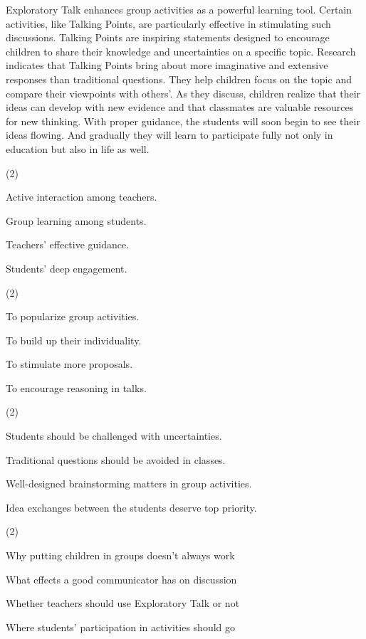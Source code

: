 \documentclass{英语试卷}
\begin{document}
\par Exploratory Talk enhances group activities as a powerful learning tool. Certain activities, like Talking Points, are particularly effective in stimulating such discussions. Talking Points are inspiring statements designed to encourage children to share their knowledge and uncertainties on a specific topic. Research indicates that Talking Points bring about more imaginative and extensive responses than traditional questions. They help children focus on the topic and compare their viewpoints with others'. As they discuss, children realize that their ideas can develop with new evidence and that classmates are valuable resources for new thinking. With proper guidance, the students will soon begin to see their ideas flowing. And gradually they will learn to participate fully not only in education but also in life as well.\par
{}
\begin{choices}(2)
  \item Active interaction among teachers.
  \item Group learning among students.
  \item Teachers' effective guidance.
  \item Students' deep engagement.
\end{choices}
\begin{choices}(2)
  \item To popularize group activities.
  \item To build up their individuality.
  \item To stimulate more proposals.
  \item To encourage reasoning in talks.
\end{choices}
\begin{choices}(2)
  \item Students should be challenged with uncertainties.
  \item Traditional questions should be avoided in classes.
  \item Well-designed brainstorming matters in group activities.
  \item Idea exchanges between the students deserve top priority.
\end{choices}
\begin{choices}(2)
  \item Why putting children in groups doesn't always work
  \item What effects a good communicator has on discussion
  \item Whether teachers should use Exploratory Talk or not
  \item Where students' participation in activities should go
\end{choices}
\end{document}
